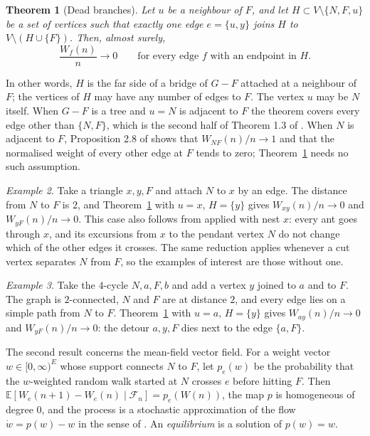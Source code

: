 \documentclass[11pt]{amsart}
\newtheorem{theorem}{Theorem}
\theoremstyle{remark}
\newtheorem{example}[theorem]{Example}
\newcommand{\EE}{\mathbb{E}}
\newcommand{\cF}{\mathcal{F}}
\begin{document}
\begin{theorem}[Dead branches]\label{thm:dead}
Let $u$ be a neighbour of $F$, and let $H\subset V\setminus\{N,F,u\}$ be a set of vertices such that exactly one edge
$e=\{u,y\}$ joins $H$ to $V\setminus(H\cup\{F\})$. Then, almost surely,
\[
\frac{W_f(n)}{n}\longrightarrow 0\qquad\text{for every edge $f$ with an endpoint in $H$.}
\]
\end{theorem}

In other words, $H$ is the far side of a bridge of $G-F$ attached at a neighbour of $F$; the vertices of $H$ may have
any number of edges to $F$. The vertex $u$ may be $N$ itself. When $G-F$ is a tree and $u=N$ is adjacent to $F$ the
theorem covers every edge other than $\{N,F\}$, which is the second half of Theorem 1.3 of \cite{KMS}. When $N$ is
adjacent to $F$, Proposition 2.8 of \cite{KMS} shows that $W_{NF}(n)/n\to1$ and that the normalised weight of every
other edge at $F$ tends to zero; Theorem~\ref{thm:dead} needs no such assumption.

\begin{example}\label{ex:paw}
Take a triangle $x,y,F$ and attach $N$ to $x$ by an edge. The distance from $N$ to $F$ is $2$, and
Theorem~\ref{thm:dead} with $u=x$, $H=\{y\}$ gives $W_{xy}(n)/n\to0$ and $W_{yF}(n)/n\to0$. This case also follows
from \cite[Theorem 1.3]{KMS} applied with nest $x$: every ant goes through $x$, and its excursions from $x$ to the
pendant vertex $N$ do not change which of the other edges it crosses. The same reduction applies whenever a
cut vertex separates $N$ from $F$, so the examples of interest are those without one.
\end{example}

\begin{example}\label{ex:c4}
Take the $4$-cycle $N,a,F,b$ and add a vertex $y$ joined to $a$ and to $F$. The graph is $2$-connected, $N$ and $F$
are at distance $2$, and every edge lies on a simple path from $N$ to $F$. Theorem~\ref{thm:dead} with $u=a$,
$H=\{y\}$ gives $W_{ay}(n)/n\to0$ and $W_{yF}(n)/n\to0$: the detour $a,y,F$ dies next to the edge $\{a,F\}$.
\end{example}

The second result concerns the mean-field vector field. For a weight vector $w\in[0,\infty)^E$ whose support connects
$N$ to $F$, let $p_e(w)$ be the probability that the $w$-weighted random walk started at $N$ crosses $e$ before
hitting $F$. Then $\EE[W_e(n+1)-W_e(n)\mid\cF_n]=p_e(W(n))$, the map $p$ is homogeneous of degree $0$, and the process
is a stochastic approximation of the flow $\dot w=p(w)-w$ in the sense of \cite{Ben,Pem90}. An \emph{equilibrium} is a solution of $p(w)=w$.
\end{document}
